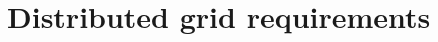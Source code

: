 %

%

%

%

\newpage

\section{Distributed grid requirements}

\setcounter{section}{0}
\renewcommand{\thesection}{\shortname\arabic{section}}
\renewcommand{\thesubsection}{\shortname\arabic{section}.\arabic{subsection}}
\renewcommand{\thesubsubsection}{\shortname\arabic{section}.\arabic{subsection}.\arabic{subsubsection}}



%

 


%





















